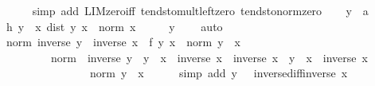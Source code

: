 \begin{isabellebody}
\ \ \ \ \isamarkupfalse%
\ {\isacharparenleft}{\kern0pt}simp\ add{\isacharcolon}{\kern0pt}\ LIM{\isacharunderscore}{\kern0pt}zero{\isacharunderscore}{\kern0pt}iff\ tendsto{\isacharunderscore}{\kern0pt}mult{\isacharunderscore}{\kern0pt}left{\isacharunderscore}{\kern0pt}zero\ tendsto{\isacharunderscore}{\kern0pt}norm{\isacharunderscore}{\kern0pt}zero{\isacharparenright}{\kern0pt}\isanewline
{}\isamarkupfalse%
\isanewline
\ \ \isamarkupfalse%
\ y\ {\isacharcolon}{\kern0pt}{\isacharcolon}{\kern0pt}\ {\isacharprime}{\kern0pt}a\isanewline
\ \ \isamarkupfalse%
\ h{\isacharcolon}{\kern0pt}\ {\isachardoublequoteopen}y\ {\isasymnoteq}\ x{\isachardoublequoteclose}\ {\isachardoublequoteopen}dist\ y\ x\ {\isacharless}{\kern0pt}\ norm\ x{\isachardoublequoteclose}\isanewline
\ \ \isamarkupfalse%
\ \isamarkupfalse%
\ {\isachardoublequoteopen}y\ {\isasymnoteq}\ {}{\isachardoublequoteclose}\ \isamarkupfalse%
\ auto\isanewline
\ \ \isamarkupfalse%
\ {\isachardoublequoteopen}norm\ {\isacharparenleft}{\kern0pt}inverse\ y\ {\isacharminus}{\kern0pt}\ inverse\ x\ {\isacharminus}{\kern0pt}\ {\isacharquery}{\kern0pt}f\ {\isacharparenleft}{\kern0pt}y\ {\isacharminus}{\kern0pt}x{\isacharparenright}{\kern0pt}{\isacharparenright}{\kern0pt}\ {\isacharslash}{\kern0pt}\ norm\ {\isacharparenleft}{\kern0pt}y\ {\isacharminus}{\kern0pt}\ x{\isacharparenright}{\kern0pt}\ \isanewline
\ \ \ \ \ \ \ \ {\isacharequal}{\kern0pt}\ norm\ {\isacharparenleft}{\kern0pt}{\isacharminus}{\kern0pt}\ {\isacharparenleft}{\kern0pt}inverse\ y\ {\isacharasterisk}{\kern0pt}\ {\isacharparenleft}{\kern0pt}y\ {\isacharminus}{\kern0pt}\ x{\isacharparenright}{\kern0pt}\ {\isacharasterisk}{\kern0pt}\ inverse\ x\ {\isacharminus}{\kern0pt}\ inverse\ x\ {\isacharasterisk}{\kern0pt}\ {\isacharparenleft}{\kern0pt}y\ {\isacharminus}{\kern0pt}\ x{\isacharparenright}{\kern0pt}\ {\isacharasterisk}{\kern0pt}\ inverse\ x{\isacharparenright}{\kern0pt}{\isacharparenright}{\kern0pt}\ {\isacharslash}{\kern0pt}\isanewline
\ \ \ \ \ \ \ \ \ \ \ \ \ \ \ \ norm\ {\isacharparenleft}{\kern0pt}y\ {\isacharminus}{\kern0pt}\ x{\isacharparenright}{\kern0pt}{\isachardoublequoteclose}\isanewline
\ \ \ \ \isamarkupfalse%
\ {\isacharparenleft}{\kern0pt}simp\ add{\isacharcolon}{\kern0pt}\ {\isacartoucheopen}y\ {\isasymnoteq}\ {}{\isacartoucheclose}\ inverse{\isacharunderscore}{\kern0pt}diff{\isacharunderscore}{\kern0pt}inverse\ x{\isacharparenright}{\kern0pt}\isanewline
\ \ \isamarkupfalse%

\end{isabellebody}
